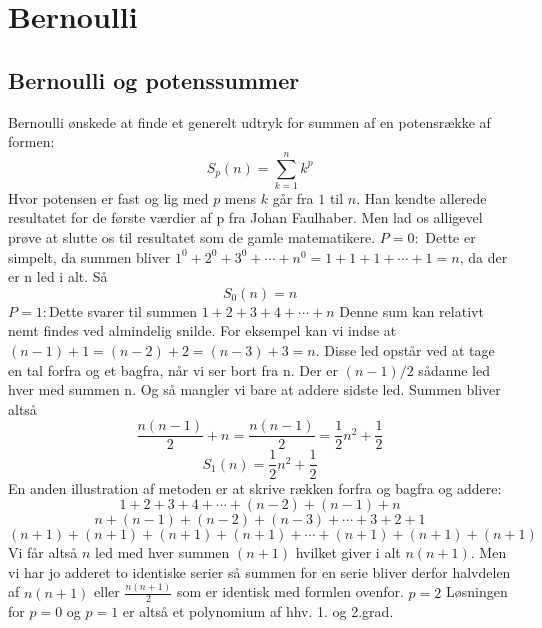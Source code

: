 \chapter{Bernoulli}
\section{Bernoulli og potenssummer}
Bernoulli ønskede at finde et generelt udtryk for summen af en potensrække af formen:
\[S_{p}(n)=\sum_{k=1}^{n}k^p\]
Hvor potensen er fast og lig med \(p\) mens \(k\) går fra \(1\) til \(n\). Han kendte allerede resultatet for de første værdier af p fra Johan Faulhaber. Men lad os alligevel prøve at slutte os til resultatet som de gamle matematikere.
\(P=0:\) Dette er simpelt, da summen bliver  \(1^0+2^0+3^0+ \dotsm + n^0=1+1+1+\dotsm+1=n\), da der er n led i alt. Så
\[S_{0}(n)=n\]
\(P=1:\)Dette svarer til summen \(1+2+3+4+\dotsm+n \)
Denne sum kan relativt nemt findes ved almindelig snilde. 
For eksempel kan vi indse at \((n-1)+1 = (n-2)+2 = (n-3)+ 3 = n\). Disse led opstår ved at tage en tal forfra og et bagfra, når vi ser bort fra n. Der er \((n-1)/2\) sådanne led hver med summen n. Og så mangler vi bare at addere sidste led. Summen bliver altså
\[\frac{n(n-1)}{2}+n=\frac{n(n-1)}{2}=\frac{1}{2}n^2+\frac{1}{2}\]
\[S_{1}(n)= \frac{1}{2}n^2+\frac{1}{2}\]
En anden illustration af metoden er at skrive rækken forfra og bagfra og addere:
\[1        +   2     +   3    +   4    + \dotsm+(n-2) + (n-1) + n  \]
\[n        + (n-1) +(n-2)+(n-3)+\dotsm+   3     +    2    + 1\]
\[(n+1)+ (n+1)+(n+1)+(n+1)+\dotsm+(n+1)+(n+1)+(n+1)\]
Vi får altså \(n\) led med hver summen \((n+1)\) hvilket giver i alt \(n(n+1)\). Men vi har jo adderet to identiske serier så summen for en serie bliver derfor halvdelen af \(n(n+1)\) eller \(\frac{n(n+1)}{2}\) som er identisk med formlen ovenfor.
\(p=2\) Løsningen for \(p=0\) og \(p=1\) er altså et polynomium af hhv. 1. og 2.grad. 
